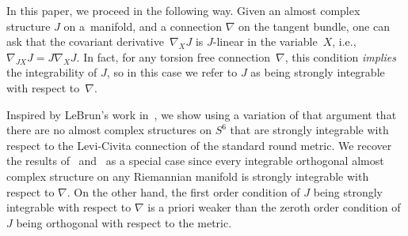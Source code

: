 In this paper, we proceed in the following way. Given an almost complex structure $J$ on a~manifold, and a connection $\nabla$ on the tangent bundle, one can ask that the covariant derivative~$\nabla_X J$ is $J$-linear in the variable~$X$, i.e., $\nabla_{J X } J = J \nabla_X J$. In fact, for any torsion free connection~$\nabla$, this condition \emph{implies} the integrability of $J$, so in this case we refer to $J$ as being strongly integrable with respect to~$\nabla$.

Inspired by LeBrun's work in~\cite{L}, we show using a variation of that argument that there are no almost complex structures on $S^6$ that are strongly integrable with respect to the Levi-Civita connection of the standard round metric. We recover the results of~\cite{Bl} and~\cite{L} as a special case since every integrable orthogonal almost complex structure on any Riemannian manifold is strongly integrable with respect to $\nabla$. On the other hand, the first order condition of $J$ being strongly integrable with respect to $\nabla$ is a priori weaker than the zeroth order condition of $J$ being orthogonal with respect to the metric.
